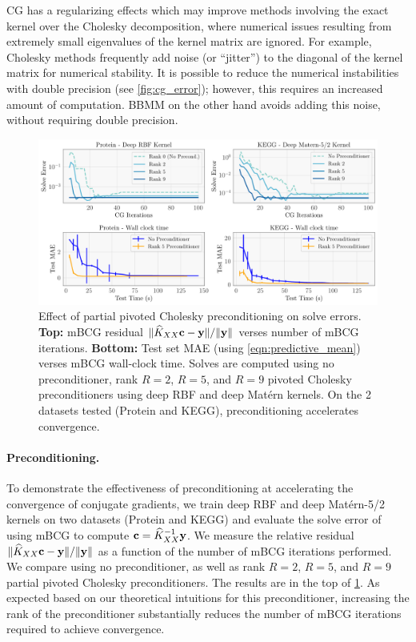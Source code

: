 CG has a regularizing effects which may improve methods involving the exact kernel over the Cholesky decomposition, where numerical issues resulting from extremely small eigenvalues of the kernel matrix are ignored.
For example, Cholesky methods frequently add noise (or ``jitter'') to the diagonal of the kernel matrix for numerical stability.
It is possible to reduce the numerical instabilities with double precision (see \cref{fig:cg_error}); however, this requires an increased amount of computation.
BBMM on the other hand avoids adding this noise, without requiring double precision.

\begin{figure}[t]
  \centering
  \includegraphics[width=\textwidth]{figures/precond_solves}
  \caption[Effect of partial pivoted Cholesky preconditioning on mBCG solve errors.]{
    Effect of partial pivoted Cholesky preconditioning on solve errors.
		{\bf Top:} mBCG residual $\Vert \widehat{K}_{XX} \mathbf{c} - \mathbf{y} \Vert / \Vert \mathbf{y} \Vert$ verses number of mBCG iterations.
		{\bf Bottom:} Test set MAE (using \cref{eqn:predictive_mean}) verses mBCG wall-clock time.
		Solves are computed using no preconditioner, rank $R=2$, $R=5$, and $R=9$ pivoted Cholesky preconditioners using deep RBF and deep Mat\'ern kernels.
		On the 2 datasets tested (Protein and KEGG), preconditioning accelerates convergence.
  }
  \label{fig:precond_results}
\end{figure}

\paragraph{Preconditioning.}
To demonstrate the effectiveness of preconditioning at accelerating the convergence of conjugate gradients,
we train deep RBF and deep Mat\'ern-5/2 kernels on two datasets (Protein and KEGG) and evaluate the solve error of using mBCG to compute $\mathbf{c} = \widehat{K}_{XX}^{-1}\mathbf{y}$.
We measure the relative residual $\Vert \widehat{K}_{XX}\mathbf{c} - \mathbf{y} \Vert / \Vert \mathbf{y} \Vert$ as a function of the number of mBCG iterations performed.
We compare using no preconditioner, as well as rank $R=2$, $R=5$, and $R=9$ partial pivoted Cholesky preconditioners.
The results are in the top of \cref{fig:precond_results}.
As expected based on our theoretical intuitions for this preconditioner, increasing the rank of the preconditioner substantially reduces the number of mBCG iterations required to achieve convergence.

